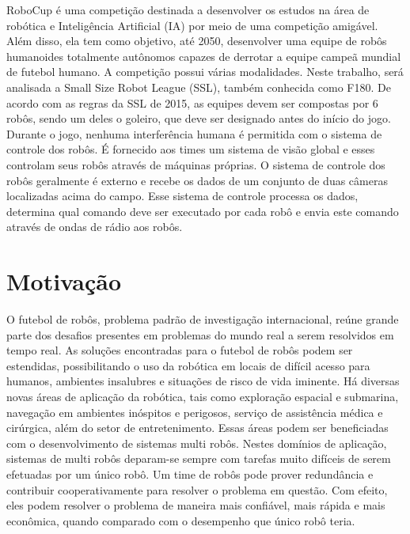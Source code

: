 RoboCup é uma competição destinada a desenvolver os estudos na área de robótica
e Inteligência Artificial (IA) por meio de uma competição amigável.  Além disso,
ela tem como objetivo, até 2050, desenvolver uma equipe de robôs humanoides
totalmente autônomos capazes de derrotar a equipe campeã mundial de futebol
humano.  A competição possui várias modalidades.  Neste trabalho, será analisada
a Small Size Robot League (SSL), também conhecida como F180.  De acordo com as
regras da SSL de 2015, as equipes devem ser compostas por 6 robôs, sendo um
deles o goleiro, que deve ser designado antes do início do jogo.  Durante o
jogo, nenhuma interferência humana é permitida com o sistema de controle dos
robôs.  É fornecido aos times um sistema de visão global e esses controlam seus
robôs através de máquinas próprias.  O sistema de controle dos robôs geralmente
é externo e recebe os dados de um conjunto de duas câmeras localizadas acima do
campo.  Esse sistema de controle processa os dados, determina qual comando deve
ser executado por cada robô e envia este comando através de ondas de rádio aos
robôs.

\section{Motivação}


O futebol de robôs, problema padrão de investigação internacional, reúne grande
parte dos desafios presentes em problemas do mundo real a serem resolvidos em
tempo real.  As soluções encontradas para o futebol de robôs podem ser
estendidas, possibilitando o uso da robótica em locais de difícil acesso para
humanos, ambientes insalubres e situações de risco de vida iminente.  Há
diversas novas áreas de aplicação da robótica, tais como exploração espacial e
submarina, navegação em ambientes inóspitos e perigosos, serviço de assistência
médica e cirúrgica, além do setor de entretenimento.  Essas áreas podem ser
beneficiadas com o desenvolvimento de sistemas multi robôs.  Nestes domínios de
aplicação, sistemas de multi robôs deparam-se sempre com tarefas muito difíceis
de serem efetuadas por um único robô.  Um time de robôs pode prover redundância
e contribuir cooperativamente para resolver o problema em questão.  Com efeito,
eles podem resolver o problema de maneira mais confiável, mais rápida e mais
econômica, quando comparado com o desempenho que único robô teria.

